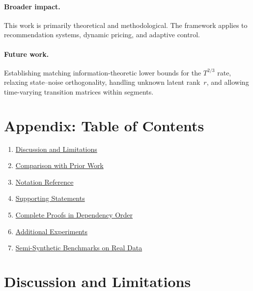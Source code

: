 \documentclass{article}
\begin{document}
\paragraph{Broader impact.}
This work is primarily theoretical and methodological.
The framework applies to recommendation systems, dynamic pricing, and adaptive control.

\paragraph{Future work.}
Establishing matching information-theoretic lower bounds for the $T^{2/3}$ rate, relaxing state--noise orthogonality, handling unknown latent rank~$r$, and allowing time-varying transition matrices within segments.




\newpage
\appendix

\section*{Appendix: Table of Contents}
\label{app:toc}
\begingroup
\hypersetup{linkcolor=blue}
\begin{enumerate}[label=\Alph*., leftmargin=1.5em, itemsep=1pt]
  \item \hyperref[sec:discussion]{Discussion and Limitations}
  \item \hyperref[app:related_table]{Comparison with Prior Work}
  \item \hyperref[app:notation]{Notation Reference}
  \item \hyperref[app:supporting_statements]{Supporting Statements}
  \item \hyperref[app:all_proofs]{Complete Proofs in Dependency Order}
  \item \hyperref[app:additional_experiments]{Additional Experiments}
  \item \hyperref[app:semi_synthetic]{Semi-Synthetic Benchmarks on Real Data}
\end{enumerate}
\endgroup

\section{Discussion and Limitations}
\label{sec:discussion}
\end{document}
